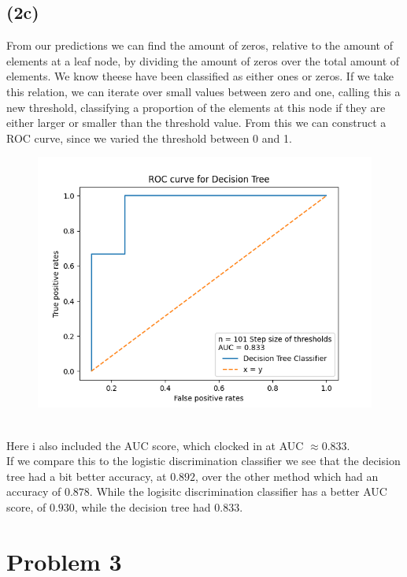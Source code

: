 \documentclass[12pt, letterpaper]{article}
\begin{document}
    \subsection*{(2c)}
      From our predictions we can find the amount of zeros, relative to the amount of elements at a leaf node, by dividing the amount of zeros over the total amount of elements. We know theese have been classified as either ones or zeros. If we take this relation, we can iterate over small values between zero and one, calling this a new threshold, classifying a proportion of the elements at this node if they are either larger or smaller than the threshold value. From this we can construct a ROC curve, since we varied the threshold between 0 and 1.\\
      \begin{figure}[H]
        \caption{}
        \centering
        \includegraphics[scale=0.8]{ROCDT}
      \end{figure}\\
      Here i also included the AUC score, which clocked in at AUC $\approx 0.833$.\\
      If we compare this to the logistic discrimination classifier we see that the decision tree had a bit better accuracy, at $0.892$, over the other method which had an accuracy of $0.878$. While the logisitc discrimination classifier has a better AUC score, of $0.930$, while the decision tree had $0.833$.
  \section*{Problem 3}
\end{document}
